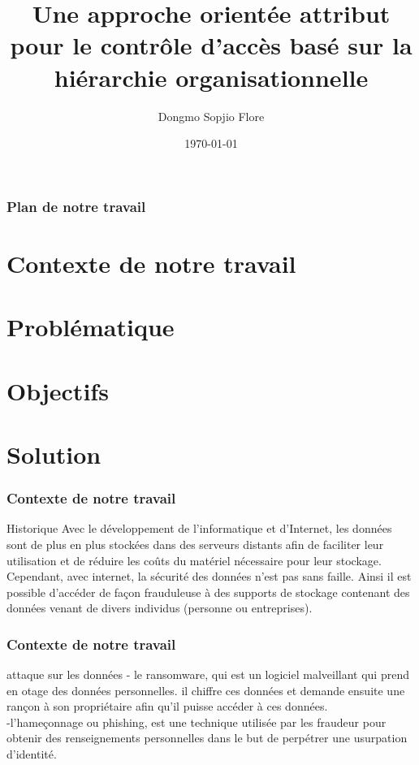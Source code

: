 \documentclass[10pt]{beamer}
\begin{document}
\title{Une approche orientée attribut pour le contrôle d'accès basé sur la hiérarchie organisationnelle}
\author{Dongmo Sopjio Flore}
\date{\today}
\maketitle

\begin{frame}
 \frametitle{Plan de notre travail}
 \tableofcontents[]
\end{frame}

\section{Contexte de notre travail}
\section{Problématique}
\section{Objectifs}
\section{Solution}

\begin{frame}
 \frametitle{Contexte de notre travail}
  \begin{block}{Historique}
    Avec le développement de l'informatique et d'Internet, les données sont de plus en plus stockées dans des serveurs distants afin de faciliter leur utilisation et de réduire les coûts du matériel nécessaire pour leur stockage. Cependant, avec internet, la sécurité des données n'est pas sans faille. Ainsi il est possible d'accéder de façon frauduleuse à des supports de stockage contenant des données venant de divers individus (personne ou entreprises). 
  \end{block}
\end{frame}

\begin{frame}
 \frametitle{Contexte de notre travail}
  \begin{block}{attaque sur les données}
    - le ransomware, qui est un logiciel malveillant qui prend en otage des données personnelles. il chiffre ces données et demande ensuite une rançon à son propriétaire afin qu'il puisse accéder à ces données. \\
    -l'hameçonnage ou phishing, est une technique utilisée par les fraudeur pour obtenir des renseignements personnelles dans le but de perpétrer une usurpation d'identité.
  \end{block}
\end{frame}
\end{document}
